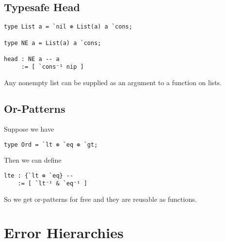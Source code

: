 \documentclass{article}
\begin{document}
\subsection{Typesafe Head}

\begin{verbatim}
type List a = `nil ⊕ List(a) a `cons;

type NE a = List(a) a `cons;

head : NE a -- a
     := [ `cons⁻¹ nip ]
\end{verbatim}

Any nonempty list can be supplied as an argument to a function on lists.

\subsection{Or-Patterns}

Suppose we have

\begin{verbatim}
type Ord = `lt ⊕ `eq ⊕ `gt;
\end{verbatim}

Then we can define

\begin{verbatim}
lte : {`lt ⊕ `eq} --
    := [ `lt⁻¹ & `eq⁻¹ ]
\end{verbatim}

So we get or-patterns for free and they are reusable as functions.






\section{Error Hierarchies}




\end{document}
